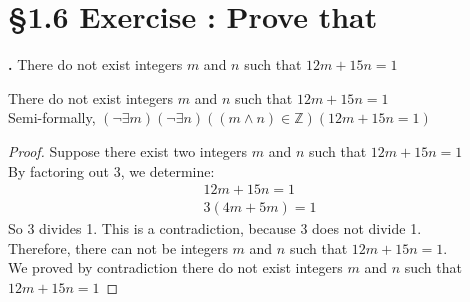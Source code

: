 \documentclass[a4paper,11pt]{article}
\begin{document}
\section*{\S 1.6 Exercise : Prove that}
\textbf{.}
There do not exist integers \(m\) and \(n\) such that \(12m+15n=1\)
\begin{theorem2}
There do not exist integers \(m\) and \(n\) such that \(12m+15n=1\)\\
Semi-formally, \((\neg\exists m)(\neg\exists n)((m \wedge n)\in \mathbb{Z})(12m+15n=1)\)
\begin{proof}
Suppose there exist two integers \(m\) and \(n\) such that \(12m+15n=1\)\\
By factoring out 3, we determine:
\begin{gather*}
12m+15n=1 \\
3(4m+5m)=1
\end{gather*}
So 3 divides 1. This is a contradiction, because 3 does not divide 1.\\
Therefore, there can not be integers \(m\) and \(n\) such that \(12m+15n=1\).\\
We proved by contradiction there do not exist integers \(m\) and \(n\) such that 
\(12m+15n=1\)
\end{proof}
\end{theorem2}

\newpage

\setcounter{ProblemCounter}{2}
\setcounter{SubsectionCounter}{1}
\end{document}
